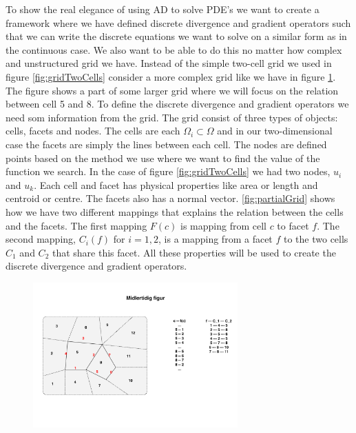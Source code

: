 To show the real elegance of using AD to solve PDE's we want to create a framework where we have defined discrete divergence and gradient operators such that we can write the discrete equations we want to solve on a similar form as in the continuous case. We also want to be able to do this no matter how complex and unstructured grid we have. Instead of the simple two-cell grid we used in figure \ref{fig:gridTwoCells} consider a more complex grid like we have in figure \ref{fig:partialGrid}. The figure shows a part of some larger grid where we will focus on the relation between cell 5 and 8. To define the discrete divergence and gradient operators we need som information from the grid. The grid consist of three types of objects: cells, facets and nodes. The cells are each $\Omega_i \subset \Omega$ and in our two-dimensional case the facets are simply the lines between each cell. The nodes are defined points based on the method we use where we want to find the value of the function we search. In the case of figure \ref{fig:gridTwoCells} we had two nodes, $u_i$ and $u_k$. Each cell and facet has physical properties like area or length and centroid or centre. The facets also has a normal vector. \autoref{fig:partialGrid} shows how we have two different mappings that explains the relation between the cells and the facets. The first mapping $F(c)$ is mapping from cell $c$ to facet $f$. The second mapping, $C_i(f)$ for $i = 1,2$, is a mapping from a facet $f$ to the two cells $C_1$ and $C_2$ that share this facet. All these properties will be used to create the discrete divergence and gradient operators.
\begin{figure}[htb]
    \centering
    \includegraphics[width = 0.7\textwidth]{figures/grid_cells_facets.pdf}
    \caption{}
    \label{fig:partialGrid}
\end{figure}

